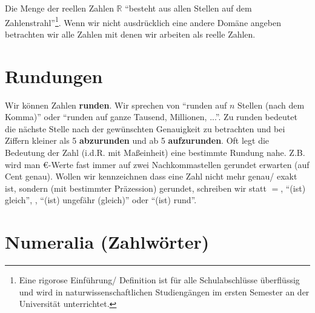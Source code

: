 \documentclass[a4paper]{book}%
\theoremstyle{definition}
\begin{document}
Die Menge der reellen Zahlen $\mathbb{R}$ \enquote{besteht aus allen Stellen auf dem Zahlenstrahl}\footnote{Eine rigorose Einführung/ Definition ist für alle Schulabschlüsse überflüssig und wird in naturwissenschaftlichen Studiengängen im ersten Semester an der Universität unterrichtet.}. Wenn wir nicht ausdrücklich eine andere Domäne angeben betrachten wir alle Zahlen mit denen wir arbeiten als reelle Zahlen.


\section{Rundungen}

Wir können Zahlen \textbf{runden}. Wir sprechen von \enquote{runden auf $n$ Stellen (nach dem Komma)} oder \enquote{runden auf ganze Tausend, Millionen, ...}. Zu runden bedeutet die nächste Stelle nach der gewünschten Genauigkeit zu betrachten und bei Ziffern kleiner als 5 \textbf{abzurunden} und ab 5 \textbf{aufzurunden}. Oft legt die Bedeutung der Zahl (i.d.R. mit Maßeinheit) eine bestimmte Rundung nahe. Z.B. wird man €-Werte fast immer auf zwei Nachkommastellen gerundet erwarten (auf Cent genau). Wollen wir kennzeichnen dass eine Zahl nicht mehr genau/ exakt ist, sondern (mit bestimmter Präzession) gerundet, schreiben wir statt $=$, \enquote{(ist) gleich}, , \enquote{(ist) ungefähr (gleich)} oder \enquote{(ist) rund}.


\section{Numeralia (Zahlwörter)}\label{numeralia}
\end{document}
